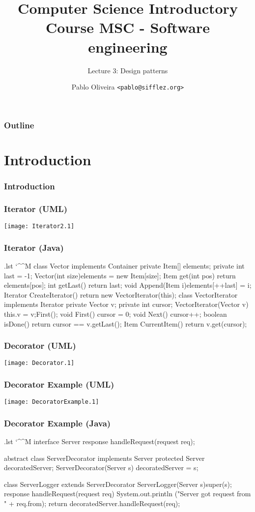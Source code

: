 \documentclass[10pt]{beamer}
\title{Computer Science Introductory Course MSC - Software engineering}
\subtitle{Lecture 3: Design patterns}
\author[Pablo Oliveira]{Pablo Oliveira \texttt{<pablo@sifflez.org>}}
\institute{ENST}
\date{}
\makeatletter
\newenvironment{code}{%
  \begingroup
  \@bsphack
  \immediate\openout\lstvrb@out\jobname.lst
  \let\do\@makeother\dospecials\catcode`\^^M\active
  \def\verbatim@processline{%
    \immediate\write\lstvrb@out{\the\verbatim@line}}%
  \verbatim@start}{%
  \immediate\closeout\lstvrb@out
  \@esphack
  \endgroup

  \begin{alertblock}{}
    
  \end{alertblock}}
\makeatother
\begin{document}
\begin{frame}
  \titlepage
\end{frame}

\begin{frame}
  \frametitle{Outline}
  \tableofcontents
\end{frame}

\section{Introduction}
\begin{frame}
\frametitle{Introduction}
\end{frame}


\begin{frame}
  \frametitle{Iterator (UML)}
  \begin{center}
    \texttt{[image: Iterator2.1]}
  \end{center}
\end{frame}
\begin{frame}
  \frametitle{Iterator (Java)}
    \begin{code}
  class Vector implements Container {
    private Item[] elements;
    private int last = -1;
    Vector(int size){elements = new Item[size];}
    Item get(int pos) {return elements[pos];}
    int getLast() {return last;}
    void Append(Item i){elements[++last] = i;}
    Iterator CreateIterator()
      {return new VectorIterator(this);}
  }
  class VectorIterator implements Iterator {
    private Vector v;
    private int cursor;
    VectorIterator(Vector v) {this.v = v;First();}
    void First() {cursor = 0;}
    void Next() {cursor++;}
    boolean isDone() {return cursor == v.getLast();}
    Item CurrentItem() {return v.get(cursor);}
  }
\end{code}
\end{frame}


\begin{frame}
  \frametitle{Decorator (UML)}
  \begin{center}
    \texttt{[image: Decorator.1]}
  \end{center}
\end{frame}
\begin{frame}
  \frametitle{Decorator Example (UML)}
  \begin{center}
    \texttt{[image: DecoratorExample.1]}
  \end{center}
\end{frame}
\begin{frame}
  \frametitle{Decorator Example (Java)}
\begin{code}
interface Server {
  response handleRequest(request req);
}

abstract class ServerDecorator implements Server {
  protected Server decoratedServer;
  ServerDecorator(Server s) {decoratedServer = s;}
}

class ServerLogger extends ServerDecorator {
  ServerLogger(Server s){super(s);}
  response handleRequest(request req) {
    System.out.println
      ("Server got request from " + req.from);
    return decoratedServer.handleRequest(req);
  }
}
\end{code}
\end{frame}
\end{document}
